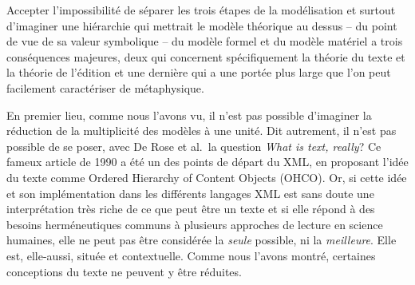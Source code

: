 Accepter l'impossibilité de séparer les trois étapes de la modélisation
et surtout d'imaginer une hiérarchie qui mettrait le modèle théorique au
dessus -- du point de vue de sa valeur symbolique -- du modèle formel et
du modèle matériel a trois conséquences majeures, deux qui concernent
spécifiquement la théorie du texte et la théorie de l'édition et une
dernière qui a une portée plus large que l'on peut facilement
caractériser de métaphysique.

En premier lieu, comme nous l'avons vu, il n'est pas possible d'imaginer
la réduction de la multiplicité des modèles à une unité. Dit autrement,
il n'est pas possible de se poser, avec De Rose et al.~la question
\emph{What is text, really}? Ce fameux article de 1990 a été un des
points de départ du XML, en proposant l'idée du texte comme Ordered
Hierarchy of Content Objects (OHCO). Or, si cette idée et son
implémentation dans les différents langages XML est sans doute une
interprétation très riche de ce que peut être un texte et si elle répond
à des besoins herméneutiques communs à plusieurs approches de lecture en
science humaines, elle ne peut pas être considérée la \emph{seule}
possible, ni la \emph{meilleure}. Elle est, elle-aussi, située et
contextuelle. Comme nous l'avons montré, certaines conceptions du texte
ne peuvent y être réduites.

